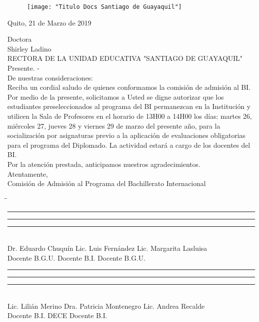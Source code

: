 \documentclass[12pt, a4paper]{article}
\begin{document}
\begin{figure}[h]
	\centering
	\texttt{[image: "Titulo Docs Santiago de Guayaquil"]}
\end{figure}

\begin{flushright}
	Quito, 21 de Marzo de 2019\\[0.35in]
	
\end{flushright}

\noindent
Doctora\\
Shirley Ladino\\
RECTORA DE LA UNIDAD EDUCATIVA "SANTIAGO DE GUAYAQUIL"\\
Presente. -\\[0.25in]
\noindent
De nuestras consideraciones:\\[0.25in]
\noindent
Reciba un cordial saludo de quienes conformamos la comisión de admisión al BI.\\[0.25in]
\noindent
Por medio de la presente, solicitamos a Usted se digne autorizar que los estudiantes preseleccionados al programa del BI permanezcan en la Institución y utilicen la Sala de Profesores en el horario de 13H00 a 14H00 los días: martes 26, miércoles 27, jueves 28 y viernes 29 de marzo del presente año, para la socialización por asignaturas previo a la aplicación de evaluaciones obligatorias para el programa del Diplomado. La actividad estará a cargo de los docentes del BI.\\[0.25in]

\noindent
Por la atención prestada, anticipamos nuestros agradecimientos.\\[0.25in]
\noindent
Atentamente,\\[0.25in]

\noindent
Comisión de Admisión al Programa del Bachillerato Internacional\\[0.25in]


\begin{tabbing}
	\hspace{160pt}\=\hspace{160pt}\=\kill

	\rule{5cm}{0.5pt} \>\rule{5cm}{0.5pt} \>\rule{5cm}{0.5pt} \\ 
	Dr. Eduardo Chuquín\> Lic. Luis Fernández  \>Lic. Margarita Lasluisa \\
	Docente B.G.U. \> Docente B.I.  \>Docente B.G.U. \\ [0.5in]
	
	\rule{5cm}{0.5pt} \>\rule{5cm}{0.5pt} \>\rule{5cm}{0.5pt} \\ 
	Lic. Lilián Merino\> Dra. Patricia Montenegro \>Lic. Andrea Recalde\\
	Docente B.I. \> DECE  \>Docente B.I. \\
	
\end{tabbing} 
\end{document}
